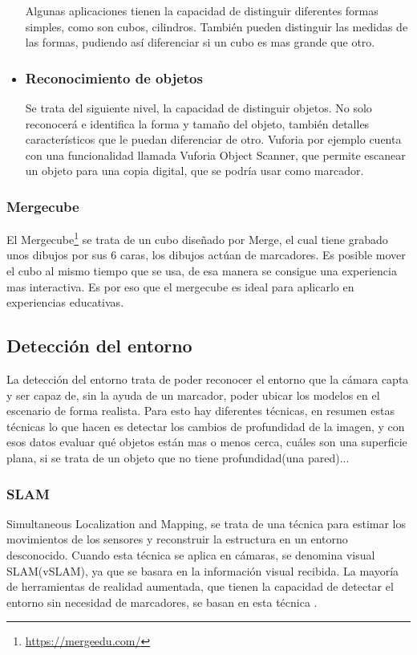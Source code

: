 \begin{itemize}
		Algunas aplicaciones tienen la capacidad de distinguir diferentes formas simples, como son cubos, cilindros. También pueden distinguir las medidas de las formas, pudiendo así diferenciar si un cubo es mas grande que otro.
		\item \subsubsection{Reconocimiento de objetos}
		Se trata del siguiente nivel, la capacidad de distinguir objetos. No solo reconocerá e identifica la forma y tamaño del objeto, también detalles característicos que le puedan diferenciar de otro. Vuforia por ejemplo cuenta con una funcionalidad llamada Vuforia Object Scanner, que permite escanear un objeto para una copia digital, que se podría usar como marcador.
	\end{itemize}
	\subsubsection{Mergecube}
	El Mergecube\footnote{\url{https://mergeedu.com/}} se trata de un cubo diseñado por Merge, el cual tiene grabado unos dibujos por sus 6 caras, los dibujos actúan de marcadores. Es posible mover el cubo al mismo tiempo que se usa, de esa manera se consigue una experiencia mas interactiva. Es por eso que el mergecube es ideal para aplicarlo en experiencias educativas.
	\subsection{Detección del entorno}
	La detección del entorno trata de poder reconocer el entorno que la cámara capta y ser capaz de, sin la ayuda de un marcador, poder ubicar los modelos en el escenario de forma realista.
	Para esto hay diferentes técnicas, en resumen estas técnicas lo que hacen es detectar los cambios de profundidad de la imagen, y con esos datos evaluar qué objetos están mas o menos cerca, cuáles son una superficie plana, si se trata de un objeto que no tiene profundidad(una pared)...
	\subsubsection{SLAM}
	Simultaneous Localization and Mapping, se trata de una técnica para estimar los movimientos de los sensores y reconstruir la estructura en un entorno desconocido. Cuando esta técnica se aplica en cámaras, se denomina visual SLAM(vSLAM), ya que se basara en la información visual recibida.
	La mayoría de herramientas de realidad aumentada, que tienen la capacidad de detectar el entorno sin necesidad de marcadores, se basan en esta técnica \cite{taketomi2017visual}.
	
